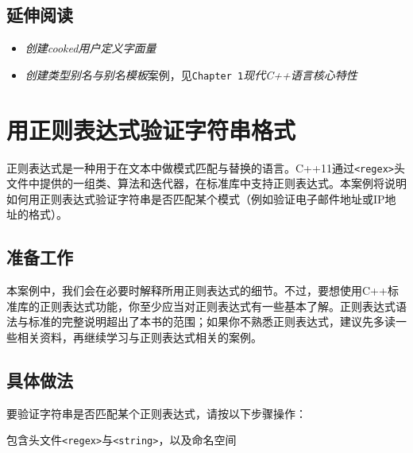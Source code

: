 
\subsection{延伸阅读}



\begin{itemize}
\item \textit{创建cooked用户定义字面量}



\item \textit{创建类型别名与别名模板}案例，见\texttt{Chapter 1}\textit{现代C++语言核心特性}

\end{itemize}



\section{用正则表达式验证字符串格式}



正则表达式是一种用于在文本中做模式匹配与替换的语言。C++11通过\texttt{<\allowbreak{}regex>}头文件中提供的一组类、算法和迭代器，在标准库中支持正则表达式。本案例将说明如何用正则表达式验证字符串是否匹配某个模式（例如验证电子邮件地址或IP地址的格式）。



\subsection{准备工作}



本案例中，我们会在必要时解释所用正则表达式的细节。不过，要想使用C++标准库的正则表达式功能，你至少应当对正则表达式有一些基本了解。正则表达式语法与标准的完整说明超出了本书的范围；如果你不熟悉正则表达式，建议先多读一些相关资料，再继续学习与正则表达式相关的案例。



\subsection{具体做法}



要验证字符串是否匹配某个正则表达式，请按以下步骤操作：



包含头文件\texttt{<\allowbreak{}regex>}与\texttt{<\allowbreak{}string>}，以及命名空间



